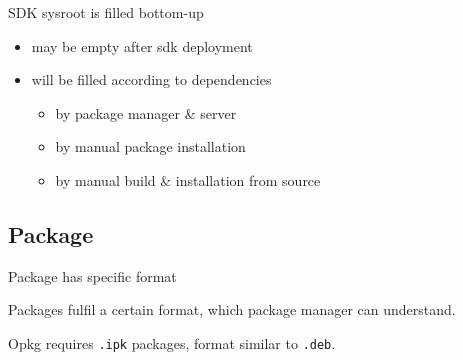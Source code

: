 \documentclass{beamer}
\begin{document}
\begin{frame}{SDK sysroot is filled bottom-up}
    \begin{block}{}
        \begin{itemize}
            \item{may be empty after sdk deployment}
            \item{will be filled according to dependencies}
            \begin{itemize}
                \item{by package manager \& server}
                \item{by manual package installation}
                \item{by manual build \& installation from source}
            \end{itemize}
        \end{itemize}
    \end{block}
\end{frame}

\subsection{Package}

\begin{frame}[fragile]{Package has specific format}
    \begin{block}{}
        Packages fulfil a certain format, which package manager can understand.
    \end{block}
    \begin{block}{}
        Opkg requires \verb|.ipk| packages, format similar to \verb|.deb|.
    \end{block}
\end{frame}
\end{document}
